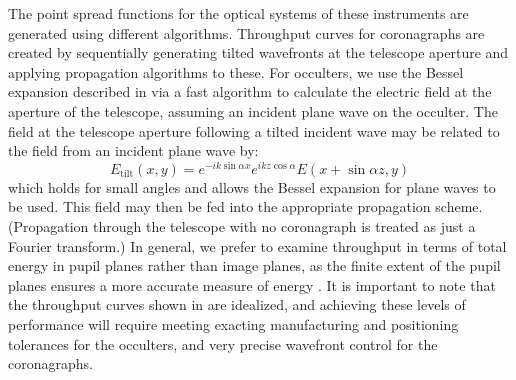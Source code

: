 The point spread functions for the optical systems of these instruments are generated using different algorithms. Throughput curves for coronagraphs are created by sequentially generating tilted wavefronts at the telescope aperture and applying propagation algorithms to these.  For occulters, we use the Bessel expansion described in \citet{vanderbei2007} via a fast algorithm to calculate the electric field at the aperture of the telescope, assuming an incident plane wave on the occulter.  The field at the telescope aperture following a tilted incident wave may be related to the field from an incident plane wave by:
\begin{equation}
    E_{\mathrm{tilt}}(x, y) = e^{-i k \sin{\alpha} x} e^{i k z \cos{\alpha}} E(x + \sin{\alpha} z, y)
\end{equation}
which holds for small angles and allows the Bessel expansion for plane waves to be used. This field may then be fed into the appropriate propagation scheme.  (Propagation through the telescope with no coronagraph is treated as just a Fourier transform.)  In general, we prefer to examine throughput in terms of total energy in pupil planes rather than image planes, as the finite extent of the pupil planes ensures a more accurate measure of energy \citep{kasdin2006}.  It is important to note that the throughput curves shown in  are idealized, and achieving these levels of performance will require meeting exacting manufacturing and positioning tolerances for the occulters, and very precise wavefront control for the coronagraphs.
